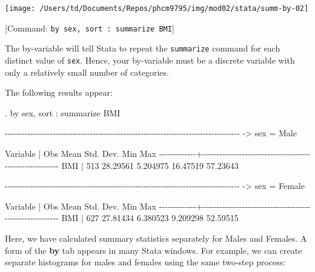 \documentclass[
]{memoir}
\newenvironment{Shaded}{\begin{snugshade}}{\end{snugshade}}
\newcommand{\NormalTok}[1]{#1}
\begin{document}
\texttt{[image: /Users/td/Documents/Repos/phcm9795/img/mod02/stata/summ-by-02]}

{[}Command: \texttt{by\ sex,\ sort\ :\ summarize\ BMI}{]}

The by-variable will tell Stata to repeat the \texttt{summarize} command for each distinct value of \texttt{sex}. Hence, your by-variable must be a discrete variable with only a relatively small number of categories.

The following results appear:

\begin{Shaded}
\begin{Highlighting}[]
\NormalTok{. by sex, sort : summarize BMI}

\NormalTok{{-}{-}{-}{-}{-}{-}{-}{-}{-}{-}{-}{-}{-}{-}{-}{-}{-}{-}{-}{-}{-}{-}{-}{-}{-}{-}{-}{-}{-}{-}{-}{-}{-}{-}{-}{-}{-}{-}{-}{-}{-}{-}{-}{-}{-}{-}{-}{-}{-}{-}{-}{-}{-}{-}{-}{-}{-}{-}{-}{-}{-}{-}{-}{-}{-}{-}{-}{-}{-}{-}{-}{-}{-}{-}{-}{-}{-}{-}{-}{-}{-}{-}{-}}
\NormalTok{{-}\textgreater{} sex = Male}

\NormalTok{    Variable |        Obs        Mean    Std. Dev.       Min        Max}
\NormalTok{{-}{-}{-}{-}{-}{-}{-}{-}{-}{-}{-}{-}{-}+{-}{-}{-}{-}{-}{-}{-}{-}{-}{-}{-}{-}{-}{-}{-}{-}{-}{-}{-}{-}{-}{-}{-}{-}{-}{-}{-}{-}{-}{-}{-}{-}{-}{-}{-}{-}{-}{-}{-}{-}{-}{-}{-}{-}{-}{-}{-}{-}{-}{-}{-}{-}{-}{-}{-}{-}{-}}
\NormalTok{         BMI |        513    28.29561    5.204975   16.47519   57.23643}

\NormalTok{{-}{-}{-}{-}{-}{-}{-}{-}{-}{-}{-}{-}{-}{-}{-}{-}{-}{-}{-}{-}{-}{-}{-}{-}{-}{-}{-}{-}{-}{-}{-}{-}{-}{-}{-}{-}{-}{-}{-}{-}{-}{-}{-}{-}{-}{-}{-}{-}{-}{-}{-}{-}{-}{-}{-}{-}{-}{-}{-}{-}{-}{-}{-}{-}{-}{-}{-}{-}{-}{-}{-}{-}{-}{-}{-}{-}{-}{-}{-}{-}{-}{-}{-}}
\NormalTok{{-}\textgreater{} sex = Female}

\NormalTok{    Variable |        Obs        Mean    Std. Dev.       Min        Max}
\NormalTok{{-}{-}{-}{-}{-}{-}{-}{-}{-}{-}{-}{-}{-}+{-}{-}{-}{-}{-}{-}{-}{-}{-}{-}{-}{-}{-}{-}{-}{-}{-}{-}{-}{-}{-}{-}{-}{-}{-}{-}{-}{-}{-}{-}{-}{-}{-}{-}{-}{-}{-}{-}{-}{-}{-}{-}{-}{-}{-}{-}{-}{-}{-}{-}{-}{-}{-}{-}{-}{-}{-}}
\NormalTok{         BMI |        627    27.81434    6.380523   9.209298   52.59515}
\end{Highlighting}
\end{Shaded}

Here, we have calculated summary statistics separately for Males and Females.
A form of the \textbf{by} tab appears in many Stata windows. For example, we can create separate histograms for males and females using the same two-step process:
\end{document}

